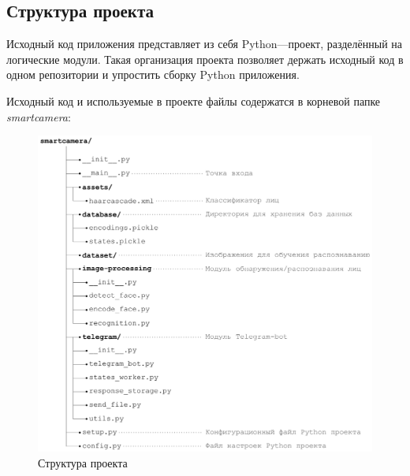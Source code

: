 \subsection{Структура проекта}

Исходный код приложения представляет из себя Python—проект, разделённый на
логические модули. Такая организация проекта позволяет держать исходный код
в одном репозитории и упростить сборку Python приложения.

Исходный код и используемые в проекте файлы содержатся в корневой папке
\textit{smartcamera}:

\begin{figure}[h!]
  \centering
  \setlength{\fboxsep}{5pt}
  \includegraphics[width=1\textwidth]{data-visualisation/project-tree}
  \vspace*{6pt}
  \caption{Структура проекта}\label{fig:project-tree}
\end{figure}
